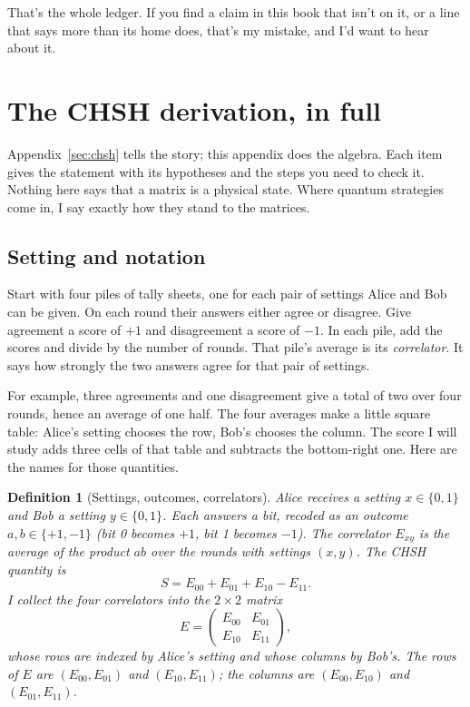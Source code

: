 \documentclass[11pt,twoside]{article}
\theoremstyle{thielethm}
\theoremstyle{thieledef}
\newtheorem{definition}{Definition}[section]
\theoremstyle{thieledef}
\theoremstyle{thieledef}
\theoremstyle{thielethm}
\theoremstyle{thieleobs}
\theoremstyle{thielethm}
\begin{document}
That's the whole ledger. If you find a claim in this book that isn't on it, or a line that
says more than its home does, that's my mistake, and I'd want to hear about it.



\section{The CHSH derivation, in full}

Appendix~\ref{sec:chsh} tells the story; this appendix does the algebra. Each item gives
the statement with its hypotheses and the steps you need to check it. Nothing here says
that a matrix is a physical state. Where quantum strategies come in, I say exactly how they
stand to the matrices.

\subsection{Setting and notation}


Start with four piles of tally sheets, one for each pair of settings Alice
and Bob can be given. On each round their answers either agree or disagree.
Give agreement a score of $+1$ and disagreement a score of $-1$. In each pile,
add the scores and divide by the number of rounds. That pile's average is its
\emph{correlator}. It says how strongly the two answers agree for that pair of
settings.

For example, three agreements and one disagreement give a total of two over
four rounds, hence an average of one half. The four averages make a little
square table: Alice's setting chooses the row, Bob's chooses the column.
The score I will study adds three cells of that table and subtracts the
bottom-right one. Here are the names for those quantities.

\begin{definition}[Settings, outcomes, correlators]
Alice receives a setting $x \in \{0,1\}$ and Bob a setting $y \in \{0,1\}$. Each answers a
bit, recoded as an outcome $a, b \in \{+1, -1\}$ (bit 0 becomes $+1$, bit 1 becomes $-1$).
The correlator $E_{xy}$ is the average of the product $ab$ over the rounds with settings
$(x, y)$. The CHSH quantity is
\[
S = E_{00} + E_{01} + E_{10} - E_{11}.
\]
I collect the four correlators into the $2 \times 2$ matrix
\[
E = \begin{pmatrix} E_{00} & E_{01} \\ E_{10} & E_{11} \end{pmatrix},
\]
whose rows are indexed by Alice's setting and whose columns by Bob's. The rows of $E$ are
$(E_{00}, E_{01})$ and $(E_{10}, E_{11})$; the columns are $(E_{00}, E_{10})$ and
$(E_{01}, E_{11})$.
\end{definition}
\end{document}
